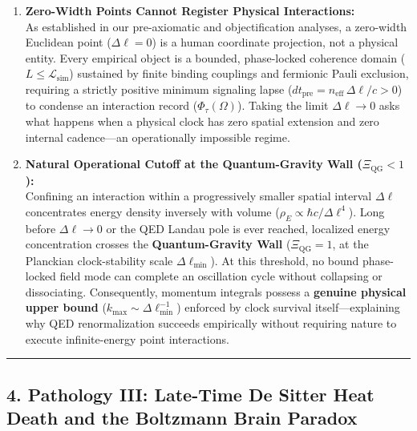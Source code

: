 \documentclass[
]{article}
\providecommand{\tightlist}{%
  \setlength{\itemsep}{0pt}\setlength{\parskip}{0pt}}
\begin{document}
\begin{enumerate}
\def\labelenumi{\arabic{enumi}.}
\tightlist
\item
  \textbf{Zero-Width Points Cannot Register Physical Interactions:}\\
  As established in our pre-axiomatic and objectification analyses, a
  zero-width Euclidean point (\(\Delta\ell = 0\)) is a human coordinate
  projection, not a physical entity. Every empirical object is a
  bounded, phase-locked coherence domain
  (\(L \le \mathcal{L}_{\mathrm{sim}}\)) sustained by finite binding
  couplings and fermionic Pauli exclusion, requiring a strictly positive
  minimum signaling lapse
  (\(dt_{\mathrm{pre}} = n_{\mathrm{eff}}\,\Delta\ell / c > 0\)) to
  condense an interaction record (\(\Phi_\tau(\Omega)\)). Taking the
  limit \(\Delta\ell \to 0\) asks what happens when a physical clock has
  zero spatial extension and zero internal cadence---an operationally
  impossible regime.
\item
  \textbf{Natural Operational Cutoff at the Quantum-Gravity Wall
  (\(\Xi_{\mathrm{QG}} < 1\)):}\\
  Confining an interaction within a progressively smaller spatial
  interval \(\Delta\ell\) concentrates energy density inversely with
  volume (\(\rho_E \propto \hbar c / \Delta\ell^4\)). Long before
  \(\Delta\ell \to 0\) or the QED Landau pole is ever reached, localized
  energy concentration crosses the \textbf{Quantum-Gravity Wall}
  (\(\Xi_{\mathrm{QG}} = 1\), at the Planckian clock-stability scale
  \(\Delta\ell_{\min}\)). At this threshold, no bound phase-locked field
  mode can complete an oscillation cycle without collapsing or
  dissociating. Consequently, momentum integrals possess a
  \textbf{genuine physical upper bound}
  (\(k_{\max} \sim \Delta\ell_{\min}^{-1}\)) enforced by clock survival
  itself---explaining why QED renormalization succeeds empirically
  without requiring nature to execute infinite-energy point
  interactions.
\end{enumerate}

\begin{center}\rule{0.5\linewidth}{0.5pt}\end{center}

\subsection{4. Pathology III: Late-Time De Sitter Heat Death and the
Boltzmann Brain
Paradox}\label{pathology-iii-late-time-de-sitter-heat-death-and-the-boltzmann-brain-paradox}
\end{document}
